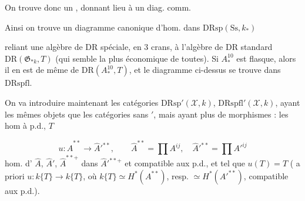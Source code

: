 \documentclass[11pt,a4paper]{article}
\begin{document}



On trouve donc un , donnant lieu à un diag. comm.


Ainsi on trouve un diagramme canonique d'hom. dans $\mathrm{DRsp}(\mathrm{Ss}, k_{*})$


reliant une \add{\ill{}} algèbre de DR spéciale, en $3$ crans, à l'algèbre de DR standard $\mathrm{DR}(\mathfrak{G}_{*k}, T)$ (qui semble la plus économique de toutes). Si $A^{1 0}_{*}$ est \add{\ill{}} flasque, alors il en est de même de $\mathrm{DR}(A^{10}_{*}, T)$, et le diagramme ci-dessus se trouve dans $\mathrm{DRspfl}$.

On va introduire maintenant les catégories $\mathrm{DRsp}'(\mathcal{X}, k)$, $\mathrm{DRspfl}'(\mathcal{X}, k)$, ayant les mêmes objets que les catégories sans ${}'$, mais ayant plus de morphismes : les hom \struck{\ill{}}  \struck{\ill{}} à p.d.,  $T$

\[
u : \widehat{A}^{**} \to \widehat{A}'^{**},
\qquad
\widehat{A}^{**} = \prod A^{ij},
\quad
\widehat{A}'^{**} = \prod A'^{ij}
\]
hom. d'  $\widehat{A}$, $\widehat{A}'$,  $\widehat{A}^{**+}$ dans $\widehat{A}'^{**+}$ et compatible aux p.d., et tel que $u(T) = T$ ( a priori $u : k\{T\} \to k\{T\}$, où $k\{T\} \simeq H^{*}(A^{**})$, resp. $\simeq H^{*}(A'^{**})$,  compatible aux p.d.). 
\end{document}
